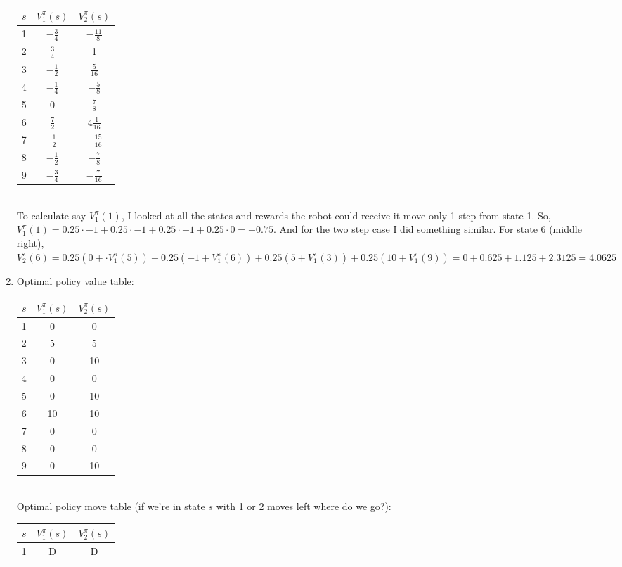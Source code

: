 \documentclass[submit]{harvardml}
\begin{document}
\begin{enumerate}
\begin{tabular} {c|c|c}
	$s$ & $V_1^\pi(s)$ & $V_2^\pi(s)$ \\
	\hline
	1 & $-\frac{3}{4}$ & $-\frac{11}{8}$ \\
	2 & $\frac{3}{4}$ & 1 \\
	3 & $-\frac{1}{2}$ & $\frac{5}{16}$ \\
	4 & $-\frac{1}{4}$ & $-\frac{5}{8}$ \\
	5 & 0 & $\frac{7}{8}$ \\
	6 & $\frac{7}{2}$ & 4$\frac{1}{16}$ \\
	7 & -$\frac{1}{2}$ & $-\frac{15}{16}$ \\
	8 & $-\frac{1}{2}$ & $-\frac{7}{8}$ \\
	9 & $-\frac{3}{4}$ & $-\frac{7}{16}$ \\
\end{tabular} \\
To calculate say  $V_1^\pi(1)$, I looked at all the states and rewards the robot could receive it move only 1 step from state 1.  So, $V_1^\pi(1) = 0.25\cdot -1 + 0.25\cdot -1 +0.25\cdot -1 + 0.25\cdot0 = -0.75$.  And for the two step case I did something similar. For state 6 (middle right),  $V_2^\pi(6) = 0.25(0+\cdot V_1^\pi(5)) + 0.25(-1+V_1^\pi(6)) + 0.25(5+V_1^\pi(3)) + 0.25(10+V_1^\pi(9)) = 0 + 0.625 + 1.125 + 2.3125 = 4.0625$ \\
\item Optimal policy value table: \\
\begin{tabular}{c | c | c}
	$s$ & $V_1^\pi(s)$ & $V_2^\pi(s)$ \\
	\hline
	1 & 0 & 0 \\
	2 & 5 & 5 \\
	3 & 0 & 10 \\
	4 & 0 & 0 \\
	5 & 0 & 10 \\
	6 & 10 & 10 \\
	7 & 0 & 0 \\
	8 & 0 & 0 \\
	9 & 0 & 10 \\
\end{tabular}  \\
Optimal policy move table (if we're in state $s$ with 1 or 2 moves left where do we go?): \\
\begin{tabular}{c | c | c}
	$s$ & $V_1^\pi(s)$ & $V_2^\pi(s)$ \\
	\hline
	1 & D & D \\

\end{tabular}
\end{enumerate}
\end{document}
